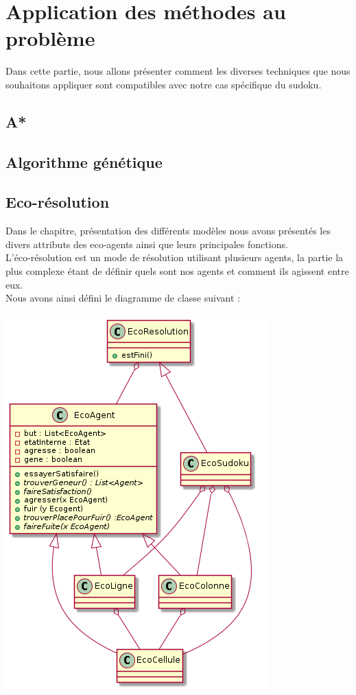 \chapter{Application des méthodes au problème}

	Dans cette partie, nous allons présenter comment les diverses techniques que nous souhaitons appliquer sont compatibles avec notre cas spécifique du sudoku.
    \section{A*}
    \section{Algorithme génétique}
    \section{Eco-résolution}
    Dans le chapitre, présentation des différents modèles nous avons présentés les divers attributs des eco-agents ainsi que leurs principales fonctions. \\
    L'éco-résolution est un mode de résolution utilisant plusieurs agents, la partie la plus complexe étant de définir quels sont nos agents et comment ils agissent entre eux. \\
    Nous avons ainsi défini le diagramme de classe suivant : \\
    \begin{center}
    \includegraphics[scale=0.7]{diagrams/ecoResolution.png}
    \end{center} 

